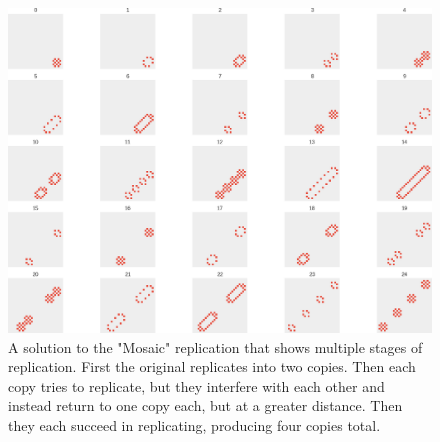 \begin{figure}
\centering
\includegraphics[width=\textwidth, keepaspectratio]{fig/result_figs/replicate_mosaic/7}
\caption[A solution to the "Mosaic" replication]{A solution to the "Mosaic" replication that shows multiple stages of replication.
First the original replicates into two copies. Then each copy tries to replicate, but they interfere with each other and instead return to one copy each, but at a greater distance.
Then they each succeed in replicating, producing four copies total.}
\label{fig:mosaic7}
\end{figure}

